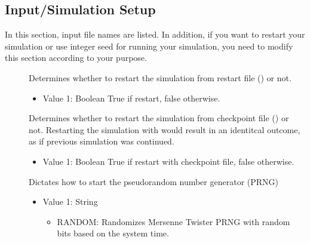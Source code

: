 \documentclass[letterpaper,10pt,english]{sphinxmanual}
\begin{document}
\subsection{Input/Simulation Setup}
\label{\detokenize{input_file:input-simulation-setup}}
In this section, input file names are listed. In addition, if you want to restart your simulation or use integer seed for running your simulation, you need to modify this section according to your purpose.
\begin{description}
\item[{}] \leavevmode
Determines whether to restart the simulation from restart file () or not.
\begin{itemize}
\item {} 
Value 1: Boolean \sphinxhyphen{} True if restart, false otherwise.

\end{itemize}

\item[{}] \leavevmode
Determines whether to restart the simulation from checkpoint file () or not. Restarting the simulation with  would result in
an identitcal outcome, as if previous simulation was continued.
\begin{itemize}
\item {} 
Value 1: Boolean \sphinxhyphen{} True if restart with checkpoint file, false otherwise.

\end{itemize}

\item[{}] \leavevmode
Dictates how to start the pseudo\sphinxhyphen{}random number generator (PRNG)
\begin{itemize}
\item {} 
Value 1: String
\begin{itemize}
\item {} 
RANDOM: Randomizes Mersenne Twister PRNG with random bits based on the system time.

\end{itemize}


\end{itemize}
\end{description}
\end{document}
